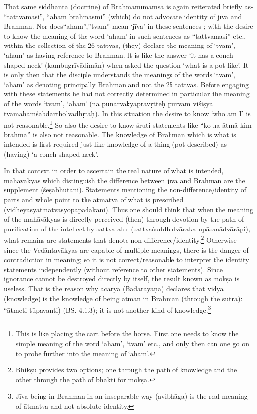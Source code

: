 That same siddhānta (doctrine) of Brahmamīmāmsā is again reiterated briefly as- “tattvamasi”, “aham brahmāsmi” (which) do not advocate identity of jīva and Brahman. Nor does“aham”,”tvam” mean ‘jīva’ in these sentences ; with the desire to know the meaning of the word ‘aham’ in such sentences as “tattvamasi” etc., within the collection of the 26 tattvas, (they) declare the meaning of ‘tvam’, ‘aham’ as having reference to Brahman. It is like the answer ‘it has a conch shaped neck’ (kambugrīvādimān) when asked the question ‘what is a pot like’. It is only then that the disciple understands the meanings of the words ‘tvam’, ‘aham’ as denoting principally Brahman and not the 25 tattvas. Before engaging with these statements he had not correctly determined in particular the meaning of the words ‘tvam’, ‘aham’ (na punarvākyapravṛtteḥ pūrvam viśiṣya tvamahamśabdārtho’vadhṛtaḥ).  In this situation the desire to know ‘who am I’ is not reasonable.\footnote{This is like placing the cart before the horse. First one needs to know the simple meaning of the word ‘aham’, ‘tvam’ etc., and only then can one go on to probe further into the meaning of ‘aham’.} So also the desire to know śruti statements like “ko na ātmā kim brahma” is also not reasonable. The knowledge of Brahman which is what is intended is first required just like knowledge of a thing (pot described) as (having) ‘a conch shaped neck’. 

In that context in order to ascertain the real nature of what is intended, mahāvākyas which distinguish the difference between jīva and Brahman are the supplement (śeṣabhūtāni). Statements mentioning the non-difference/identity of parts and whole point to the ātmatva of what is prescribed (vidheyasyātmatvasyopapādakāni). Thus one should think that when the meaning of the mahāvākyas is directly perceived (then) through devotion by the path of purification of the intellect by sattva also (sattvaśuddhidvāraka upāsanādvārāpi),  what remains are statements that denote non-difference/identity.\footnote{Bhikṣu provides two options; one through the path of knowledge and the other through the path of bhakti for mokṣa.} Otherwise since the Vedāntavākyas are capable of multiple meanings, there is the danger of contradiction in meaning; so it is not correct/reasonable to interpret the identity statements independently (without reference to other statements). Since ignorance cannot be destroyed directly by itself, the result known as mokṣa is useless. That is the reason why ācārya (Badarāyaṇa) declares that vidyā (knowledge) is the knowledge of being ātman in Brahman (through the sūtra): “ātmeti tūpayanti) (BS. 4.1.3); it is not another kind of knowledge.\footnote{Jīva being in Brahman in an inseparable way (avibhāga) is the real meaning of ātmatva and not absolute identity.} 

